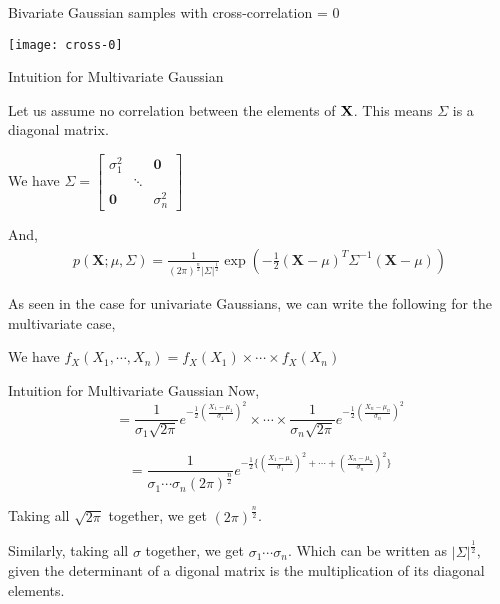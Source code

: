 \documentclass{beamer}
\begin{document}
\begin{frame}{Bivariate Gaussian samples with cross-correlation  = 0}
	\begin{center}
		\texttt{[image: cross-0]}
	\end{center}
\end{frame}



\begin{frame}{Intuition for Multivariate Gaussian}
	
	Let us assume no correlation between the elements of $\bf{X}$. This means $\Sigma$ is a diagonal matrix.
	
	We have $\Sigma = \begin{bmatrix} 
	\sigma_{1}^2 & & \textbf{0}\\
	 & \ddots &\\
	\textbf{0} &  & \sigma_n^2 
	\end{bmatrix}
	$ 
	
	And,
	\begin{gather}
		p(\mathbf{X} ; \mu, \Sigma)=\frac{1}{(2 \pi)^{\frac{n}{2}}|\Sigma|^{\frac{1}{2}}} \exp \left(-\frac{1}{2}(\mathbf{X}-\mu)^{T} \Sigma^{-1}(\mathbf{X}-\mu)\right)
	\end{gather}
	
	As seen in the case for univariate Gaussians, we can write the following for the multivariate case,
	
	We have $f_X(X_1, \cdots, X_n) = f_X(X_1)\times \cdots \times f_X(X_n)$
\end{frame}

\begin{frame}{Intuition for Multivariate Gaussian}
	Now,
	$$=\frac{1}{\sigma_1 \sqrt{2\pi} } e^{-\frac{1}{2}\left(\frac{X_1-\mu_1}{\sigma_1}\right)^2} \times \cdots \times \frac{1}{\sigma_n \sqrt{2\pi} } e^{-\frac{1}{2}\left(\frac{X_n-\mu_n}{\sigma_n}\right)^2}$$
	
	$$= \frac{1}{\sigma_1 \cdots \sigma_n (2\pi)^{\frac{n}{2}} } e^{-\frac{1}{2}\{\left(\frac{X_1-\mu_1}{\sigma_1}\right)^2 + \cdots + \left(\frac{X_n-\mu_n}{\sigma_n}\right)^2 \}}  $$
	
	Taking all $\sqrt{2\pi}$ together, we get $(2\pi)^{\frac{n}{2}}$.
	
	Similarly, taking all $\sigma$ together, we get $\sigma_1 \cdots \sigma_n$. Which can be written as $\vert\Sigma\vert^{\frac{1}{2}}$, given the determinant of a digonal matrix is the multiplication of its diagonal elements.
\end{frame}
\end{document}
